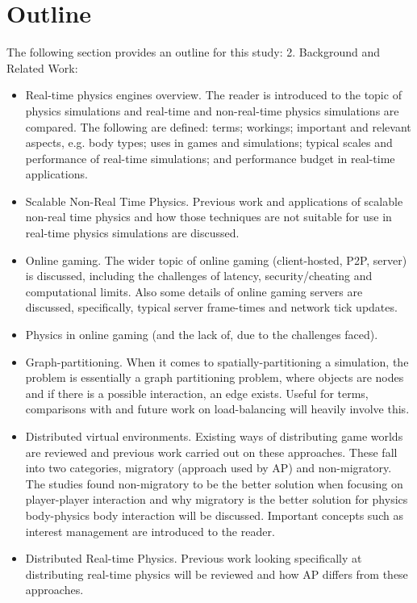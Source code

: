 \section{Outline}
The following section provides an outline for this study:
2. Background and Related Work:
\begin{itemize}
	\item Real-time physics engines overview. The reader is introduced to the topic of physics simulations and real-time and non-real-time physics simulations are compared. The following are defined: terms; workings; important and relevant aspects, e.g. body types; uses in games and simulations; typical scales and performance of real-time simulations; and performance budget in real-time applications.
	\item Scalable Non-Real Time Physics. Previous work and applications of scalable non-real time physics and how those techniques are not suitable for use in real-time physics simulations are discussed.
	\item Online gaming. The wider topic of online gaming (client-hosted, P2P, server) is discussed, including the challenges of latency, security/cheating and computational limits. Also some details of online gaming servers are discussed, specifically, typical server frame-times and network tick updates. 
	\item Physics in online gaming (and the lack of, due to the challenges faced).
	\item Graph-partitioning. When it comes to spatially-partitioning a simulation, the problem is essentially a graph partitioning problem, where objects are nodes and if there is a possible interaction, an edge exists. Useful for terms, comparisons with and future work on load-balancing will heavily involve this.
	\item Distributed virtual environments. Existing ways of distributing game worlds are reviewed and previous work carried out on these approaches. These fall into two categories, migratory (approach used by AP) and non-migratory. The studies found non-migratory to be the better solution when focusing on player-player interaction and why migratory is the better solution for physics body-physics body interaction will be discussed. Important concepts such as interest management are introduced to the reader.
	\item Distributed Real-time Physics. Previous work looking specifically at distributing real-time physics will be reviewed and how AP differs from these approaches.

\end{itemize}
